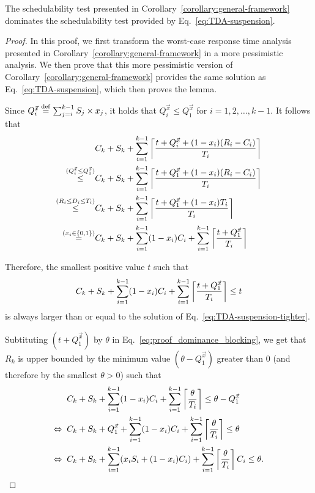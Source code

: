 \begin{Lemma}
  \label{lem:dominance_blocking}
  The schedulability test presented in
  Corollary~\ref{corollary:general-framework} dominates the
  schedulability test provided by Eq.~\eqref{eq:TDA-suspension}.
\end{Lemma}
\begin{proof}
  In this proof, we first transform the worst-case response time analysis presented in Corollary~\ref{corollary:general-framework} in a more pessimistic analysis. We then prove that this more pessimistic version of Corollary~\ref{corollary:general-framework} provides the same solution as Eq.~\eqref{eq:TDA-suspension}, which then proves the lemma.
  
  Since $Q_i^{\vec{x}} \stackrel{\mathrm{def}}{=} \sum_{j=i}^{k-1} S_j \times x_j$, it holds that $Q_i^{\vec{x}} \leq  Q_1^{\vec{x}}$ for $i=1,2,\ldots,k-1$. It follows that
  \begin{align*}
  & C_k + S_k + \sum_{i=1}^{k-1}\left\lceil{\frac{t+Q_i^{\vec{x}}+(1-x_i)(R_i-C_i)}{T_i}}\right\rceil \\
  \stackrel{(Q_i^{\vec{x}} \leq  Q_1^{\vec{x}})}{\leq} & C_k + S_k + \sum_{i=1}^{k-1}\left\lceil{\frac{t+Q_1^{\vec{x}}+(1-x_i)(R_i-C_i)}{T_i}}\right\rceil \\
  \stackrel{(R_i \leq D_i \leq T_i)}{\leq} & C_k + S_k + \sum_{i=1}^{k-1}\left\lceil{\frac{t+Q_1^{\vec{x}}+(1-x_i)T_i}{T_i}}\right\rceil \\
  \stackrel{(x_i \in \{0,1\})}{=} & C_k + S_k + \sum_{i=1}^{k-1} (1-x_i)C_i + \sum_{i=1}^{k-1}\left\lceil{\frac{t+Q_1^{\vec{x}}}{T_i}}\right\rceil \\
  \end{align*}
  
  Therefore, the smallest positive value $t$ such that  
  \begin{equation}
  \label{eq:proof_dominance_blocking}
  C_k + S_k + \sum_{i=1}^{k-1} (1-x_i)C_i + \sum_{i=1}^{k-1}\ceiling{\frac{t+Q_1^{\vec{x}}}{T_i}} \leq t
  \end{equation}
  is always larger than or equal to the solution of Eq.~\eqref{eq:TDA-suspension-tighter}. 
  
  Subtituting $(t+Q_1^{\vec{x}})$ by $\theta$ in Eq.~\eqref{eq:proof_dominance_blocking}, we get that $R_k$ is upper bounded by the minimum value $(\theta-Q_1^{\vec{x}})$ greater than $0$ (and therefore by the smallest $\theta > 0$) such that 
  \begin{align}
  & C_k + S_k + \sum_{i=1}^{k-1} (1-x_i)C_i + \sum_{i=1}^{k-1}\ceiling{\frac{\theta}{T_i}}\leq \theta-Q_1^{\vec{x}} \nonumber \\
  \Leftrightarrow \;\; & C_k + S_k + Q_1^{\vec{x}} + \sum_{i=1}^{k-1} (1-x_i)C_i + \sum_{i=1}^{k-1}\ceiling{\frac{\theta}{T_i}}\leq \theta \nonumber \\
\Leftrightarrow \;\; & C_k + S_k + \sum_{i=1}^{k-1}(x_i S_i + (1-x_i) C_i) + \sum_{i=1}^{k-1}\ceiling{\frac{\theta}{T_i}}C_i \leq \theta \label{eq:proof_dominance_blocking_final}.
    \end{align}
    

\end{proof}
